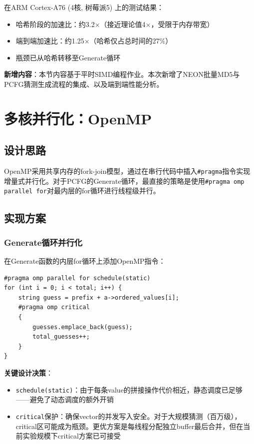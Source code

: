 \documentclass[12pt,a4paper]{ctexart}
\begin{document}
在ARM Cortex-A76 (4核, 树莓派5) 上的测试结果：
\begin{itemize}[nosep]
    \item 哈希阶段的加速比：约3.2×（接近理论值4×，受限于内存带宽）
    \item 端到端加速比：约1.25×（哈希仅占总时间的27\%）
    \item 瓶颈已从哈希转移至Generate循环
\end{itemize}

\textbf{新增内容}：本节内容基于平时SIMD编程作业。本次新增了NEON批量MD5与PCFG猜测生成流程的集成、以及端到端性能分析。

\section{多核并行化：OpenMP}

\subsection{设计思路}

OpenMP采用共享内存的fork-join模型，通过在串行代码中插入\texttt{\#pragma}指令实现增量式并行化。对于PCFG的Generate循环，最直接的策略是使用\texttt{\#pragma omp parallel for}对最内层的for循环进行线程级并行。

\subsection{实现方案}

\subsubsection{Generate循环并行化}

在Generate函数的内层for循环上添加OpenMP指令：

\begin{lstlisting}[caption={OpenMP并行Generate},label=lst:omp_generate]
#pragma omp parallel for schedule(static)
for (int i = 0; i < total; i++) {
    string guess = prefix + a->ordered_values[i];
    #pragma omp critical
    {
        guesses.emplace_back(guess);
        total_guesses++;
    }
}
\end{lstlisting}

\textbf{关键设计决策}：
\begin{itemize}[nosep]
    \item \texttt{schedule(static)}：由于每条value的拼接操作代价相近，静态调度已足够——避免了动态调度的额外开销
    \item \texttt{critical}保护：确保vector的并发写入安全。对于大规模猜测（百万级），critical区可能成为瓶颈。更优方案是每线程分配独立buffer最后合并，但在当前实验规模下critical方案已可接受
\end{itemize}
\end{document}
